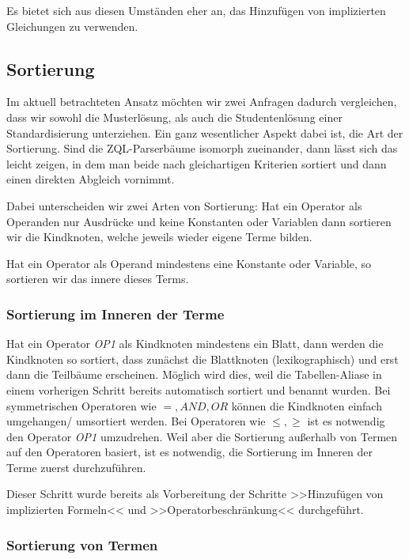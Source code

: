 Es bietet sich aus diesen Umständen eher an, das Hinzufügen von implizierten Gleichungen zu verwenden.

\subsection{Sortierung}

Im aktuell betrachteten Ansatz möchten wir zwei Anfragen dadurch vergleichen, dass wir sowohl die Musterlösung, als auch die Studentenlösung einer Standardisierung unterziehen. Ein ganz wesentlicher Aspekt dabei ist, die Art der Sortierung. Sind die ZQL-Parserbäume isomorph zueinander, dann lässt sich das leicht zeigen, in dem man beide nach gleichartigen Kriterien sortiert und dann einen direkten Abgleich vornimmt.

Dabei unterscheiden wir zwei Arten von Sortierung: Hat ein Operator als Operanden nur Ausdrücke und keine Konstanten oder Variablen dann sortieren wir die Kindknoten, welche jeweils wieder eigene Terme bilden.

Hat ein Operator als Operand mindestens eine Konstante oder Variable, so sortieren wir das innere dieses Terms.

\subsubsection{Sortierung im Inneren der Terme}

Hat ein Operator \textit{OP1} als Kindknoten mindestens ein Blatt, dann werden die Kindknoten so sortiert, dass zunächst die Blattknoten (lexikographisch) und erst dann die Teilbäume erscheinen. Möglich wird dies, weil die Tabellen-Aliase in einem vorherigen Schritt bereits automatisch sortiert und benannt wurden. Bei symmetrischen Operatoren wie $=,  \textit{AND}, \textit{OR}$ können die Kindknoten einfach umgehangen/ umsortiert werden. Bei Operatoren wie $\le,\ge$ ist es notwendig den Operator \textit{OP1} umzudrehen. Weil aber die Sortierung außerhalb von Termen auf den Operatoren basiert, ist es notwendig, die Sortierung im Inneren der Terme zuerst durchzuführen.

Dieser Schritt wurde bereits als Vorbereitung der Schritte >>Hinzufügen von implizierten Formeln<< und >>Operatorbeschränkung<< durchgeführt. 

\subsubsection{Sortierung von Termen}

